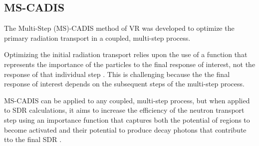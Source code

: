 \subsection{MS-CADIS}\label{sec:mscadis}
The Multi-Step (MS)-CADIS method of VR was developed to optimize the primary
radiation transport in a coupled, multi-step process.

Optimizing the initial radiation transport
relies upon the use of a function that represents the importance of the particles to the
final response of interest, not the response of that individual step \cite{mscadis}.  
This is challenging because the the final response of interest depends on the subsequent 
steps of the multi-step process.

MS-CADIS can be applied to any coupled, multi-step process, but when applied to
SDR calculations, it aims to increase the efficiency of the neutron transport step
using an importance function that captures both the potential of regions to become 
activated and their potential to produce decay photons that contribute tto the final SDR \cite{mscadis}.

